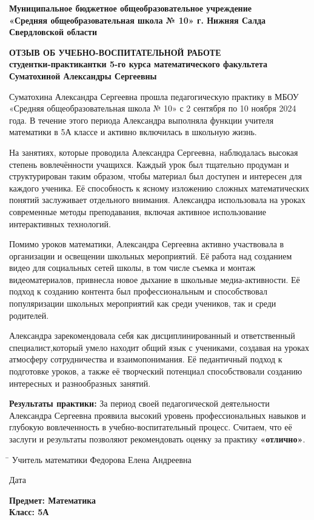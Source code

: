 \documentclass[a4paper,12pt]{article}
\begin{document}
\begin{center}
    \textbf{Муниципальное бюджетное общеобразовательное учреждение}\\
    \textbf{«Средняя общеобразовательная школа № 10» г. Нижняя Салда Свердловской области}\\
    \end{center}
\begin{center}
    \textbf{\large ОТЗЫВ ОБ УЧЕБНО-ВОСПИТАТЕЛЬНОЙ РАБОТЕ}\\
    \textbf{студентки-практикантки 5-го курса математического факультета}\\
    \textbf{Суматохиной Александры Сергеевны}
    \end{center}
\vspace{10mm}

Суматохина Александра Сергеевна прошла педагогическую практику в МБОУ «Средняя общеобразовательная школа № 10» с 2 сентября по 10 ноября 2024 года. В течение этого периода Александра выполняла функции учителя математики в 5А классе и активно включилась в школьную жизнь.

На занятиях, которые проводила Александра Сергеевна, наблюдалась высокая степень вовлечённости учащихся. Каждый урок был тщательно продуман и структурирован таким образом, чтобы материал был доступен и интересен для каждого ученика. Её способность к ясному изложению сложных математических понятий заслуживает отдельного внимания. Александра использовала на уроках современные методы преподавания, включая активное использование интерактивных технологий.

Помимо уроков математики, Александра Сергеевна активно участвовала в организации и освещении школьных мероприятий. Её работа над созданием видео для социальных сетей школы, в том числе съемка и монтаж видеоматериалов, привнесла новое дыхание в школьные медиа-активности. Её подход к созданию контента был профессиональным и способствовал популяризации школьных мероприятий как среди учеников, так и среди родителей.

Александра зарекомендовала себя как дисциплинированный и ответственный специалист,который умело находит общий язык с учениками, создавая на уроках атмосферу сотрудничества и взаимопонимания. Её педантичный подход к подготовке уроков, а также её творческий потенциал способствовали созданию интересных и разнообразных занятий.

\vspace{5mm}

\textbf{Результаты практики:} За период своей педагогической деятельности Александра Сергеевна проявила высокий уровень профессиональных навыков и глубокую вовлеченность в учебно-воспитательный процесс. Считаем, что её заслуги и результаты позволяют рекомендовать оценку за практику \textbf{«отлично»}.

\vspace{10mm}

\noindent
\begin{tabbing}
\hspace{4cm} \= \kill
Учитель математики \> \underline{\hspace{5cm}} Федорова Елена Андреевна
\end{tabbing}
Дата \underline{\hspace{5cm}}

\vspace{5mm}

\noindent
\textbf{Предмет: Математика}\\
\textbf{Класс: 5А}\\
\end{document}
